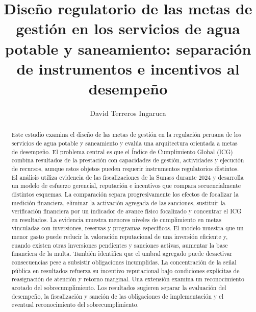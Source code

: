 \documentclass{pas}
\begin{document}

\title{Diseño regulatorio de las metas de gestión en los servicios de agua potable y saneamiento: separación de instrumentos e incentivos al desempeño}

\author{David Terreros Ingaruca}



\begin{abstract}

Este estudio examina el diseño de las metas de gestión en la regulación peruana de los servicios de agua potable y saneamiento y evalúa una arquitectura orientada a metas de desempeño. El problema central es que el Índice de Cumplimiento Global (ICG) combina resultados de la prestación con capacidades de gestión, actividades y ejecución de recursos, aunque estos objetos pueden requerir instrumentos regulatorios distintos. El análisis utiliza evidencia de las fiscalizaciones de la Sunass durante 2024 y desarrolla un modelo de esfuerzo gerencial, reputación e incentivos que compara secuencialmente distintos esquemas. La comparación separa progresivamente los efectos de focalizar la medición financiera, eliminar la activación agregada de las sanciones, sustituir la verificación financiera por un indicador de avance físico focalizado y concentrar el ICG en resultados. La evidencia muestra menores niveles de cumplimiento en metas vinculadas con inversiones, reservas y programas específicos. El modelo muestra que un menor gasto puede reducir la valoración reputacional de una inversión eficiente y, cuando existen otras inversiones pendientes y sanciones activas, aumentar la base financiera de la multa. También identifica que el umbral agregado puede desactivar consecuencias pese a subsistir obligaciones incumplidas. La concentración de la señal pública en resultados refuerza su incentivo reputacional bajo condiciones explícitas de reasignación de atención y retorno marginal. Una extensión examina un reconocimiento acotado del sobrecumplimiento. Los resultados sugieren separar la evaluación del desempeño, la fiscalización y sanción de las obligaciones de implementación y el eventual reconocimiento del sobrecumplimiento.

\end{abstract}
\end{document}
